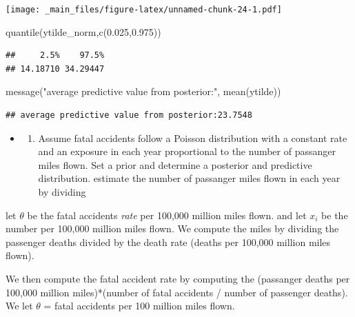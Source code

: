 \documentclass[
]{book}
\newenvironment{Shaded}{\begin{snugshade}}{\end{snugshade}}
\newcommand{\FloatTok}[1]{\textcolor[rgb]{0.00,0.00,0.81}{#1}}
\newcommand{\FunctionTok}[1]{\textcolor[rgb]{0.00,0.00,0.00}{#1}}
\newcommand{\NormalTok}[1]{#1}
\newcommand{\StringTok}[1]{\textcolor[rgb]{0.31,0.60,0.02}{#1}}
\providecommand{\tightlist}{%
  \setlength{\itemsep}{0pt}\setlength{\parskip}{0pt}}
\theoremstyle{definition}
\theoremstyle{definition}
\theoremstyle{definition}
\theoremstyle{definition}
\theoremstyle{remark}
\begin{document}
\texttt{[image: \_main\_files/figure-latex/unnamed-chunk-24-1.pdf]}

\begin{Shaded}
\begin{Highlighting}[]
 \FunctionTok{quantile}\NormalTok{(ytilde\_norm,}\FunctionTok{c}\NormalTok{(}\FloatTok{0.025}\NormalTok{,}\FloatTok{0.975}\NormalTok{))}
\end{Highlighting}
\end{Shaded}

\begin{verbatim}
##     2.5%    97.5% 
## 14.18710 34.29447
\end{verbatim}

\begin{Shaded}
\begin{Highlighting}[]
 \FunctionTok{message}\NormalTok{(}\StringTok{"average predictive value from posterior:"}\NormalTok{, }\FunctionTok{mean}\NormalTok{(ytilde))}
\end{Highlighting}
\end{Shaded}

\begin{verbatim}
## average predictive value from posterior:23.7548
\end{verbatim}

\begin{itemize}
\item
  \begin{enumerate}
  \def\labelenumi{(\alph{enumi})}
  \setcounter{enumi}{1}
  \tightlist
  \item
    Assume fatal accidents follow a Poisson distribution with a constant rate and an exposure in each year proportional to the number of passanger miles flown. Set a prior and determine a posterior and predictive distribution. estimate the number of passanger miles flown in each year by dividing
  \end{enumerate}
\end{itemize}

let \(\theta\) be the fatal accidents \emph{rate} per 100,000 million miles flown. and let \(x_i\) be the number per 100,000 million miles flown. We compute the miles by dividing the passenger deaths divided by the death rate (deaths per 100,000 million miles flown).

We then compute the fatal accident rate by computing the (passanger deaths per 100,000 million miles)*(number of fatal accidents / number of passenger deaths). We let \(\theta\) = fatal accidents per 100 million miles flown.
\end{document}
